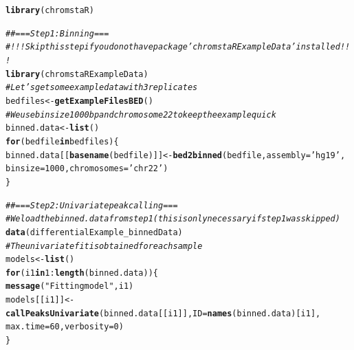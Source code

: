 \documentclass[11pt]{article}\usepackage[]{graphicx}\usepackage[]{color}
\makeatletter
\newcommand{\hlnum}[1]{\textcolor[rgb]{0.686,0.059,0.569}{#1}}%
\newcommand{\hlstr}[1]{\textcolor[rgb]{0.192,0.494,0.8}{#1}}%
\newcommand{\hlcom}[1]{\textcolor[rgb]{0.678,0.584,0.686}{\textit{#1}}}%
\newcommand{\hlopt}[1]{\textcolor[rgb]{0,0,0}{#1}}%
\newcommand{\hlstd}[1]{\textcolor[rgb]{0.345,0.345,0.345}{#1}}%
\newcommand{\hlkwa}[1]{\textcolor[rgb]{0.161,0.373,0.58}{\textbf{#1}}}%
\newcommand{\hlkwb}[1]{\textcolor[rgb]{0.69,0.353,0.396}{#1}}%
\newcommand{\hlkwc}[1]{\textcolor[rgb]{0.333,0.667,0.333}{#1}}%
\newcommand{\hlkwd}[1]{\textcolor[rgb]{0.737,0.353,0.396}{\textbf{#1}}}%
\newenvironment{kframe}{%
 \def\at@end@of@kframe{}%
 \ifinner\ifhmode%
  \def\at@end@of@kframe{\end{minipage}}%
  \begin{minipage}{\columnwidth}%
 \fi\fi%
 \def\FrameCommand##1{\hskip\@totalleftmargin \hskip-\fboxsep
 \colorbox{shadecolor}{##1}\hskip-\fboxsep
     \hskip-\linewidth \hskip-\@totalleftmargin \hskip\columnwidth}%
 \MakeFramed {\advance\hsize-\width
   \@totalleftmargin\z@ \linewidth\hsize
   \@setminipage}}%
 {\par\unskip\endMakeFramed%
 \at@end@of@kframe}
\newenvironment{knitrout}{}{} %
\makeatother
\begin{document}
\begin{scriptsize}
\begin{knitrout}
\color{fgcolor}\begin{kframe}
\begin{alltt}
\hlkwd{library}\hlstd{(chromstaR)}
\end{alltt}
\end{kframe}
\end{knitrout}

\begin{knitrout}
\color{fgcolor}\begin{kframe}
\begin{alltt}
\hlcom{## === Step 1: Binning ===}
\hlcom{# !!! Skip this step if you do not have package 'chromstaRExampleData' installed !!!}
\hlkwd{library}\hlstd{(chromstaRExampleData)}
\hlcom{# Let's get some example data with 3 replicates}
\hlstd{bedfiles} \hlkwb{<-} \hlkwd{getExampleFilesBED}\hlstd{()}
\hlcom{# We use bin size 1000bp and chromosome 22 to keep the example quick}
\hlstd{binned.data} \hlkwb{<-} \hlkwd{list}\hlstd{()}
\hlkwa{for} \hlstd{(bedfile} \hlkwa{in} \hlstd{bedfiles) \{}
  \hlstd{binned.data[[}\hlkwd{basename}\hlstd{(bedfile)]]} \hlkwb{<-} \hlkwd{bed2binned}\hlstd{(bedfile,} \hlkwc{assembly}\hlstd{=}\hlstr{'hg19'}\hlstd{,}
                                                 \hlkwc{binsize}\hlstd{=}\hlnum{1000}\hlstd{,} \hlkwc{chromosomes}\hlstd{=}\hlstr{'chr22'}\hlstd{)}
\hlstd{\}}
\end{alltt}
\end{kframe}
\end{knitrout}

\begin{knitrout}
\color{fgcolor}\begin{kframe}
\begin{alltt}
\hlcom{## === Step 2: Univariate peak calling ===}
\hlcom{# We load the binned.data from step 1 (this is only necessary if step 1 was skipped)}
\hlkwd{data}\hlstd{(differentialExample_binnedData)}
\hlcom{# The univariate fit is obtained for each sample}
\hlstd{models} \hlkwb{<-} \hlkwd{list}\hlstd{()}
\hlkwa{for} \hlstd{(i1} \hlkwa{in} \hlnum{1}\hlopt{:}\hlkwd{length}\hlstd{(binned.data)) \{}
  \hlkwd{message}\hlstd{(}\hlstr{"Fitting model "}\hlstd{, i1)}
  \hlstd{models[[i1]]} \hlkwb{<-} \hlkwd{callPeaksUnivariate}\hlstd{(binned.data[[i1]],} \hlkwc{ID}\hlstd{=}\hlkwd{names}\hlstd{(binned.data)[i1],}
                                      \hlkwc{max.time}\hlstd{=}\hlnum{60}\hlstd{,} \hlkwc{verbosity}\hlstd{=}\hlnum{0}\hlstd{)}
\hlstd{\}}
\end{alltt}
\end{kframe}
\end{knitrout}


\end{scriptsize}
\end{document}
